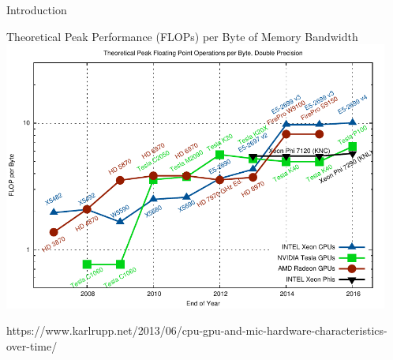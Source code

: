 \begin{frame}{Introduction}
 \vspace*{-0.5cm}
 \begin{center}
  Theoretical Peak Performance (FLOPs) per Byte of Memory Bandwidth \\
  \includegraphics[width=0.95\textwidth]{figures/flop-per-byte-dp}
 \end{center}
 \vspace*{-0.5cm}
 {\tiny https://www.karlrupp.net/2013/06/cpu-gpu-and-mic-hardware-characteristics-over-time/ }
\end{frame}



